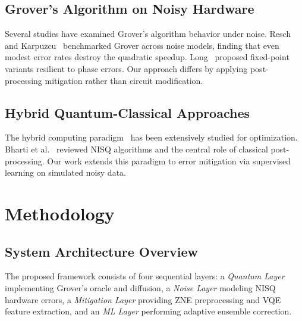 \documentclass[journal]{IEEEtran}
\begin{document}
\subsection{Grover's Algorithm on Noisy Hardware}

Several studies have examined Grover's algorithm behavior under noise. Resch and Karpuzcu~\cite{resch2021} benchmarked Grover across noise models, finding that even modest error rates destroy the quadratic speedup. Long~\cite{long2001} proposed fixed-point variants resilient to phase errors. Our approach differs by applying post-processing mitigation rather than circuit modification.

\subsection{Hybrid Quantum-Classical Approaches}

The hybrid computing paradigm~\cite{mcclean2016} has been extensively studied for optimization. Bharti et al.~\cite{bharti2022} reviewed NISQ algorithms and the central role of classical post-processing. Our work extends this paradigm to error mitigation via supervised learning on simulated noisy data.

\section{Methodology}

\subsection{System Architecture Overview}

The proposed framework consists of four sequential layers: a \emph{Quantum Layer} implementing Grover's oracle and diffusion, a \emph{Noise Layer} modeling NISQ hardware errors, a \emph{Mitigation Layer} providing ZNE preprocessing and VQE feature extraction, and an \emph{ML Layer} performing adaptive ensemble correction.
\end{document}
